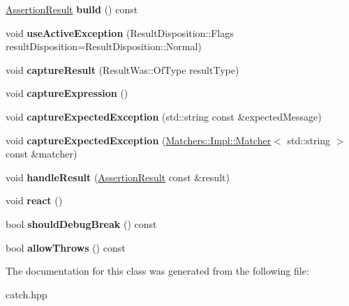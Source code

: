 \begin{DoxyCompactItemize}
\item 
\hyperlink{classCatch_1_1AssertionResult}{Assertion\+Result} {\bfseries build} () const \hypertarget{classCatch_1_1ResultBuilder_a31eba48feb02817d2151e31bd8331eeb}{}\label{classCatch_1_1ResultBuilder_a31eba48feb02817d2151e31bd8331eeb}

\item 
void {\bfseries use\+Active\+Exception} (Result\+Disposition\+::\+Flags result\+Disposition=Result\+Disposition\+::\+Normal)\hypertarget{classCatch_1_1ResultBuilder_a5bbd2f14a678f3e8d0f791ac6d233d65}{}\label{classCatch_1_1ResultBuilder_a5bbd2f14a678f3e8d0f791ac6d233d65}

\item 
void {\bfseries capture\+Result} (Result\+Was\+::\+Of\+Type result\+Type)\hypertarget{classCatch_1_1ResultBuilder_a10e467f7b7a4976e5d148b4d5066e8fd}{}\label{classCatch_1_1ResultBuilder_a10e467f7b7a4976e5d148b4d5066e8fd}

\item 
void {\bfseries capture\+Expression} ()\hypertarget{classCatch_1_1ResultBuilder_af2ae2343965802eeeb0abbd4ea9d2d36}{}\label{classCatch_1_1ResultBuilder_af2ae2343965802eeeb0abbd4ea9d2d36}

\item 
void {\bfseries capture\+Expected\+Exception} (std\+::string const \&expected\+Message)\hypertarget{classCatch_1_1ResultBuilder_a9ac96f6220c8dd8e4feee725c6228d77}{}\label{classCatch_1_1ResultBuilder_a9ac96f6220c8dd8e4feee725c6228d77}

\item 
void {\bfseries capture\+Expected\+Exception} (\hyperlink{structCatch_1_1Matchers_1_1Impl_1_1Matcher}{Matchers\+::\+Impl\+::\+Matcher}$<$ std\+::string $>$ const \&matcher)\hypertarget{classCatch_1_1ResultBuilder_a7d443d632eaeabe2cb36218b8dcb7400}{}\label{classCatch_1_1ResultBuilder_a7d443d632eaeabe2cb36218b8dcb7400}

\item 
void {\bfseries handle\+Result} (\hyperlink{classCatch_1_1AssertionResult}{Assertion\+Result} const \&result)\hypertarget{classCatch_1_1ResultBuilder_ad8bb17e4ac590b75bf8630d8f3502f4e}{}\label{classCatch_1_1ResultBuilder_ad8bb17e4ac590b75bf8630d8f3502f4e}

\item 
void {\bfseries react} ()\hypertarget{classCatch_1_1ResultBuilder_a3085cdc46533d45bed6f652a2ac295c0}{}\label{classCatch_1_1ResultBuilder_a3085cdc46533d45bed6f652a2ac295c0}

\item 
bool {\bfseries should\+Debug\+Break} () const \hypertarget{classCatch_1_1ResultBuilder_a34cdbf7ad1e5b3cb4a94047f2d14bcb2}{}\label{classCatch_1_1ResultBuilder_a34cdbf7ad1e5b3cb4a94047f2d14bcb2}

\item 
bool {\bfseries allow\+Throws} () const \hypertarget{classCatch_1_1ResultBuilder_a3dbf18a3a4b00173dab052a8864e435e}{}\label{classCatch_1_1ResultBuilder_a3dbf18a3a4b00173dab052a8864e435e}

\end{DoxyCompactItemize}


The documentation for this class was generated from the following file\+:\begin{DoxyCompactItemize}
\item 
catch.\+hpp\end{DoxyCompactItemize}
